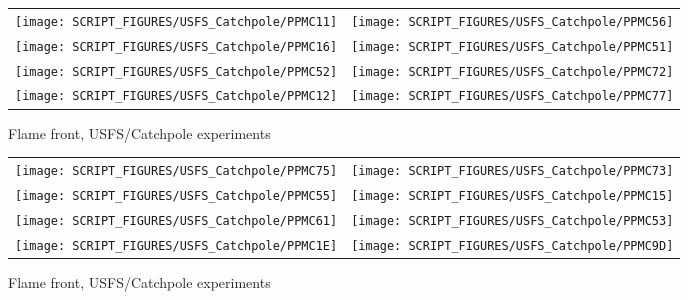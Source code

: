\begin{figure}[p]
\begin{tabular*}{\textwidth}{l@{\extracolsep{\fill}}r}
\texttt{[image: SCRIPT\_FIGURES/USFS\_Catchpole/PPMC11]} &
\texttt{[image: SCRIPT\_FIGURES/USFS\_Catchpole/PPMC56]} \\
\texttt{[image: SCRIPT\_FIGURES/USFS\_Catchpole/PPMC16]} &
\texttt{[image: SCRIPT\_FIGURES/USFS\_Catchpole/PPMC51]} \\
\texttt{[image: SCRIPT\_FIGURES/USFS\_Catchpole/PPMC52]} &
\texttt{[image: SCRIPT\_FIGURES/USFS\_Catchpole/PPMC72]} \\
\texttt{[image: SCRIPT\_FIGURES/USFS\_Catchpole/PPMC12]} &
\texttt{[image: SCRIPT\_FIGURES/USFS\_Catchpole/PPMC77]} \\
\end{tabular*}
\caption[Flame front, USFS/Catchpole experiments]{Flame front, USFS/Catchpole experiments}
\label{USFS_Catchpole_200}
\end{figure}

\begin{figure}[p]
\begin{tabular*}{\textwidth}{l@{\extracolsep{\fill}}r}
\texttt{[image: SCRIPT\_FIGURES/USFS\_Catchpole/PPMC75]} &
\texttt{[image: SCRIPT\_FIGURES/USFS\_Catchpole/PPMC73]} \\
\texttt{[image: SCRIPT\_FIGURES/USFS\_Catchpole/PPMC55]} &
\texttt{[image: SCRIPT\_FIGURES/USFS\_Catchpole/PPMC15]} \\
\texttt{[image: SCRIPT\_FIGURES/USFS\_Catchpole/PPMC61]} &
\texttt{[image: SCRIPT\_FIGURES/USFS\_Catchpole/PPMC53]} \\
\texttt{[image: SCRIPT\_FIGURES/USFS\_Catchpole/PPMC1E]} &
\texttt{[image: SCRIPT\_FIGURES/USFS\_Catchpole/PPMC9D]} \\
\end{tabular*}
\caption[Flame front, USFS/Catchpole experiments]{Flame front, USFS/Catchpole experiments}
\label{USFS_Catchpole_208}
\end{figure}

